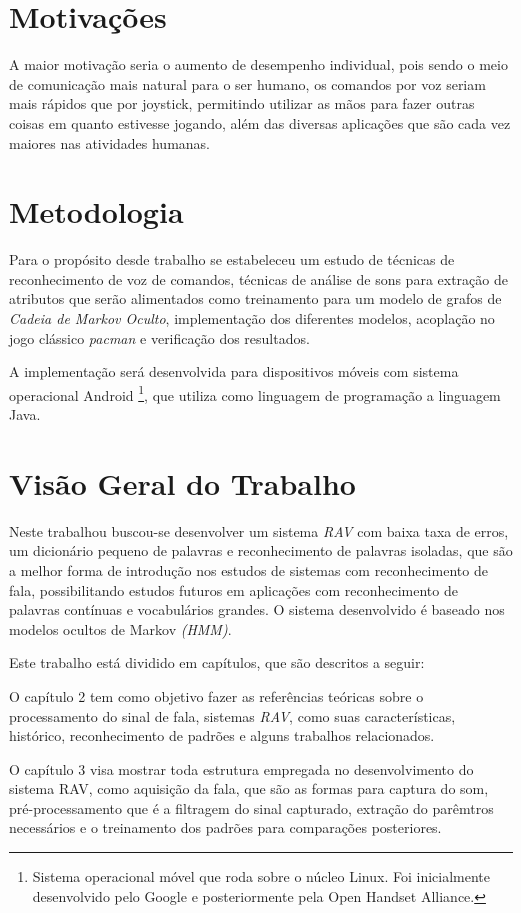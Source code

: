 \section{Motivações}
A maior motivação seria o aumento de desempenho individual, pois sendo o meio de comunicação mais natural para o ser humano, os comandos por voz seriam mais rápidos que por joystick, permitindo utilizar as mãos para fazer outras coisas em quanto estivesse jogando, além das diversas aplicações que são cada vez maiores nas atividades humanas.

\section{Metodologia}
Para o propósito desde trabalho se estabeleceu um estudo de técnicas de reconhecimento de voz de comandos, técnicas de análise de sons para extração de atributos que serão alimentados como treinamento para um modelo de grafos de \textit{Cadeia de Markov Oculto}, implementação dos diferentes modelos, acoplação no jogo clássico \textit{pacman} e verificação dos resultados.

A implementação será desenvolvida para dispositivos móveis com sistema operacional Android \footnote{ Sistema operacional móvel que roda sobre o núcleo Linux. Foi inicialmente desenvolvido pelo Google e posteriormente pela Open Handset Alliance.}, que utiliza como linguagem de programação a linguagem Java.

\section{Visão Geral do Trabalho}
Neste trabalhou buscou-se desenvolver um sistema \textit{RAV} com baixa taxa de erros, um dicionário pequeno de palavras e reconhecimento de palavras isoladas, que são a melhor forma de introdução nos estudos de sistemas com reconhecimento de fala, possibilitando estudos futuros em aplicações com reconhecimento de palavras contínuas e vocabulários grandes. O sistema desenvolvido é baseado nos modelos ocultos de Markov \textit{(HMM)}. 

Este trabalho está dividido em %
capítulos, que são descritos a seguir:

O capítulo 2 tem como objetivo fazer as referências teóricas sobre o processamento do sinal de fala, sistemas \textit{RAV}, como suas características, histórico, reconhecimento de padrões e alguns trabalhos relacionados.

O capítulo 3 visa mostrar toda estrutura empregada no desenvolvimento do sistema RAV, como aquisição da fala, que são as formas para captura do som, pré-processamento que é a filtragem do sinal capturado, extração do parêmtros necessários e o treinamento dos padrões para comparações posteriores.









